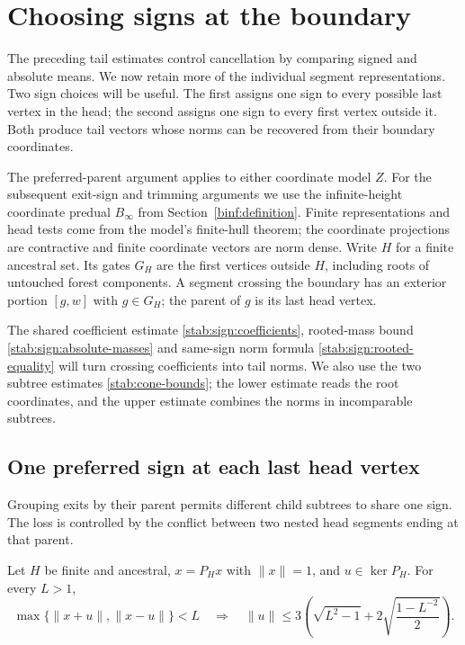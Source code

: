 \section{Choosing signs at the boundary}\label{stab:sign:section}

The preceding tail estimates control cancellation by comparing signed
and absolute means. We now retain more of the individual segment
representations. Two sign choices will be useful. The first assigns
one sign to every possible last vertex in the head; the second assigns
one sign to every first vertex outside it. Both produce tail vectors
whose norms can be recovered from their boundary coordinates.

The preferred-parent argument applies to either coordinate model $Z$.
For the subsequent exit-sign and trimming arguments we use the
infinite-height coordinate predual $B_\infty$ from
Section~\ref{binf:definition}.  Finite representations and head tests
come from the model's finite-hull theorem; the coordinate projections
are contractive and finite coordinate vectors are norm dense.
Write $H$ for a finite ancestral set. Its gates $G_H$ are the first
vertices outside $H$, including roots of untouched forest components.
A segment crossing the boundary has an exterior portion $[g,w]$ with
$g\in G_H$; the parent of $g$ is its last head vertex.

The shared coefficient estimate \eqref{stab:sign:coefficients}, rooted-mass
bound \eqref{stab:sign:absolute-masses} and same-sign norm formula
\eqref{stab:sign:rooted-equality} will turn crossing coefficients into
tail norms. We also use the two subtree estimates
\eqref{stab:cone-bounds}; the lower estimate reads the root coordinates,
and the upper estimate combines the norms in incomparable subtrees.

\subsection{One preferred sign at each last head vertex}

Grouping exits by their parent permits different child subtrees to
share one sign. The loss is controlled by the conflict between two
nested head segments ending at that parent.

\begin{proposition}\label{stab:sign:parent-lens}
Let $H$ be finite and ancestral, $x=P_Hx$ with $\|x\|=1$, and
$u\in\ker P_H$. For every $L>1$,
\begin{equation}\label{stab:sign:parent-lens-bound}
 \max\{\|x+u\|,\|x-u\|\}<L
 \quad\Longrightarrow\quad
 \|u\|\le
 3\left(\sqrt{L^2-1}
            +2\sqrt{\frac{1-L^{-2}}2}\right).
\end{equation}
\end{proposition}

